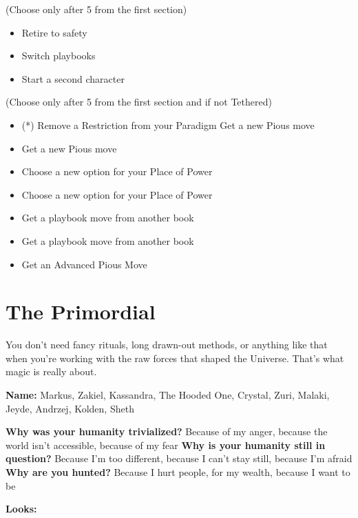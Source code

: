 \documentclass[10pt,twoside,openright]{memoir}
\begin{document}
(Choose only after 5 from the first section)

\begin{itemize}
\tightlist
\item
  Retire to safety
\item
  Switch playbooks
\item
  Start a second character
\end{itemize}

(Choose only after 5 from the first section and if not Tethered)

\begin{itemize}
\tightlist
\item
  (*) Remove a Restriction from your Paradigm Get a new Pious move
\item
  Get a new Pious move
\item
  Choose a new option for your Place of Power
\item
  Choose a new option for your Place of Power
\item
  Get a playbook move from another book
\item
  Get a playbook move from another book
\item
  Get an Advanced Pious Move
\end{itemize}

\newpage

\hypertarget{the-primordial}{%
\section{The Primordial}\label{the-primordial}}

You don't need fancy rituals, long drawn-out methods, or anything like
that when you're working with the raw forces that shaped the Universe.
That's what magic is really about.

\textbf{Name:} Markus, Zakiel, Kassandra, The Hooded One, Crystal, Zuri,
Malaki, Jeyde, Andrzej, Kolden, Sheth

\textbf{Why was your humanity trivialized?} Because of my anger, because
the world isn't accessible, because of my fear \textbf{Why is your
humanity still in question?} Because I'm too different, because I can't
stay still, because I'm afraid\\
\textbf{Why are you hunted?} Because I hurt people, for my wealth,
because I want to be

\textbf{Looks:}
\end{document}
